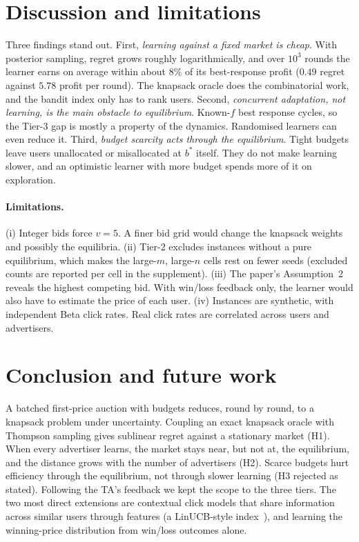 \documentclass[11pt]{article}
\begin{document}
\section{Discussion and limitations}
Three findings stand out. First, \emph{learning against a fixed market is cheap}. With posterior
sampling, regret grows roughly logarithmically, and over $10^3$ rounds the learner earns on average
within about $8\%$ of its best-response profit ($0.49$ regret against $5.78$ profit per round). The knapsack oracle does the combinatorial work, and the bandit index only has to
rank users. Second, \emph{concurrent adaptation, not learning, is the main obstacle to equilibrium}.
Known-$f$ best response cycles, so the Tier-3 gap is mostly a property of the dynamics. Randomised
learners can even reduce it. Third, \emph{budget scarcity acts through the equilibrium}. Tight
budgets leave users unallocated or misallocated at $b^*$ itself. They do not make learning slower, and
an optimistic learner with more budget spends more of it on exploration.

\paragraph{Limitations.} (i) Integer bids force $v=5$. A finer bid grid would change the knapsack
weights and possibly the equilibria. (ii) Tier-2 excludes instances without a pure equilibrium, which
makes the large-$m$, large-$n$ cells rest on fewer seeds (excluded counts are reported per cell in the
supplement). (iii) The paper's Assumption~2 reveals the highest competing bid. With win/loss feedback
only, the learner would also have to estimate the price of each user. (iv) Instances are synthetic,
with independent Beta click rates. Real click rates are correlated across users and advertisers.

\section{Conclusion and future work}
A batched first-price auction with budgets reduces, round by round, to a knapsack problem under
uncertainty. Coupling an exact knapsack oracle with Thompson sampling gives sublinear regret against a
stationary market (H1). When every advertiser learns, the market stays near, but not at, the
equilibrium, and the distance grows with the number of advertisers (H2). Scarce budgets hurt efficiency
through the equilibrium, not through slower learning (H3 rejected as stated). Following the TA's
feedback we kept the scope to the three tiers. The two most direct extensions are contextual click
models that share information across similar users through features (a LinUCB-style
index~\citep{li2010contextual}), and learning the winning-price distribution from win/loss
outcomes alone.
\end{document}
